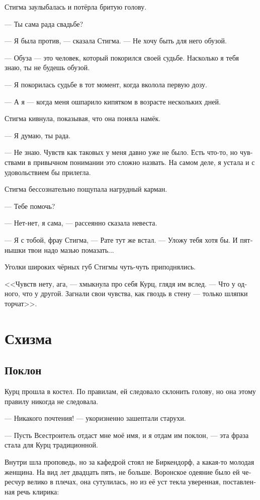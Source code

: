 \documentclass[a4paper,12pt,fleqn]{book}\usepackage{cooltooltips}\usepackage{polyglossia}\setdefaultlanguage[babelshorthands=true]{russian}\setotherlanguage{english}\defaultfontfeatures{Ligatures=TeX,Mapping=tex-text} \usepackage{xcolor}\definecolor{lightgray}{HTML}{bbbbbb}\color{lightgray}\newcommand{\ml}[3]{\textenglish{\textcolor{black}{#3}}}
\begin{document}
Стигма заулыбалась и потёрла бритую голову.

--- Ты сама рада свадьбе?

--- Я была против, --- сказала Стигма.
--- Не хочу быть для него обузой.

--- Обуза --- это человек, который покорился своей судьбе.
Насколько я тебя знаю, ты не будешь обузой.

--- Я покорилась судьбе в тот момент, когда вколола первую дозу.

--- А я --- когда меня ошпарило кипятком в возрасте нескольких дней.

Стигма кивнула, показывая, что она поняла намёк.

--- Я думаю, ты рада.

--- Не знаю.
Чувств как таковых у меня давно уже не было.
Есть что-то, но чувствами в привычном понимании это сложно назвать.
На самом деле, я устала и с удовольствием бы прилегла.

Стигма бессознательно пощупала нагрудный карман.

--- Тебе помочь?

--- Нет-нет, я сама, --- рассеянно сказала невеста.

--- Я с тобой, фрау Стигма, --- Рате тут же встал.
--- Уложу тебя хотя бы.
И пятнышки твои надо мазью помазать...

Уголки широких чёрных губ Стигмы чуть-чуть приподнялись.

<<Чувств нету, ага, --- хмыкнула про себя Курц, глядя им вслед.
--- Что у одного, что у другой.
Загнали свои чувства, как гвоздь в стену --- только шляпки торчат>>.

\chapter{Схизма}

\section{Поклон}

Курц прошла в костел.
По правилам, ей следовало склонить голову, но она этому правилу никогда не следовала.

--- Никакого почтения! --- укоризненно зашептали старухи.

--- Пусть Всестроитель отдаст мне моё имя, и я отдам им поклон, --- эта фраза стала для Курц традиционной.

Внутри шла проповедь, но за кафедрой стоял не Биркендорф, а какая-то молодая женщина.
На вид лет двадцать пять, не больше.
Воронское одеяние было ей чересчур велико в плечах, она сутулилась, но из её уст текла уверенная, поставленная речь клирика:
\end{document}
